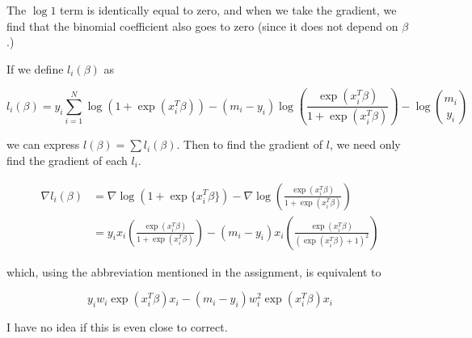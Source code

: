\documentclass{article}
\begin{document}
The $\log 1$ term is identically equal to zero, and when we take the gradient,
we find that the binomial coefficient also goes to zero (since it does not
depend on $\beta$.) 

If we define $l_i(\beta)$ as 

\[
  l_i(\beta) =  y_i \sum\limits_{i=1}^N \log (1 + \exp(x_i^T \beta)) -
   (m_i - y_i) \log\left(\frac{\exp(x_i^T\beta)}{1 + \exp(x_i^T \beta)}\right) - \log \binom{m_i}{y_i}
\]

we can express $l(\beta) = \sum l_i(\beta)$. Then to find the gradient of $l$,
we need only find the gradient of each $l_i$.

\begin{align*}
 \nabla l_i(\beta) &=  \nabla \log (1 + \exp\{x_i^T \beta\}) -
                   \nabla \log\left(\frac{\exp(x_i^T\beta)}{1 + \exp(x_i^T \beta)}\right)\\
                   &= y_i x_i \left( \frac{\exp(x_i^T \beta)}{1 + \exp(x_i^T \beta)} \right)
                     - (m_i - y_i) x_i \left( \frac{\exp(x_i^T\beta)}{(\exp(x_i^T \beta) + 1)^2} \right)
\end{align*}

which, using the abbreviation mentioned in the assignment, is equivalent to

\[
  y_iw_i \exp(x_i^T \beta) x_i - (m_i - y_i) w_i^2 \exp(x_i^T \beta) x_i
\]

I have no idea if this is even close to correct.
\end{document}
